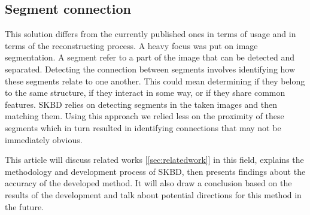 \subsection{Segment connection} %
This solution differs from the currently published ones in terms of usage and in terms of the reconstructing process. A heavy focus was put on image segmentation. A segment refer to a part of the image that can be detected and separated. Detecting the connection between segments involves identifying how these segments relate to one another. This could mean determining if they belong to the same structure, if they interact in some way, or if they share common features. SKBD relies on detecting segments in the taken images and then matching them. Using this approach we relied less on the proximity of these segments which in turn resulted in identifying connections that may not be immediately obvious.

This article will discuss related works [\ref{sec:relatedwork}] in this field, explains the methodology and development process of SKBD, then presents findings about the accuracy of the developed method. It will also draw a conclusion based on the results of the development and talk about potential directions for this method in the future.
